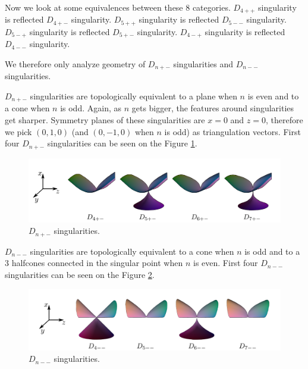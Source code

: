 Now we look at some equivalences between these 8 categories.
$D_{4++}$ singularity is reflected $D_{4+-}$ singularity.
$D_{5++}$ singularity is reflected $D_{5--}$ singularity.
$D_{5-+}$ singularity is reflected $D_{5+-}$ singularity.
$D_{4-+}$ singularity is reflected $D_{4--}$ singularity.

We therefore only analyze geometry of $D_{n+-}$ singularities and
$D_{n--}$ singularities.

$D_{n+-}$ singularities are topologically equivalent to a plane when $n$ is
even and to a cone when $n$ is odd. Again, as $n$ gets bigger, the features
around singularities get sharper. Symmetry planes of these singularities
are $x=0$ and $z=0$, therefore we pick $(0, 1, 0)$ (and $(0, -1, 0)$ when $n$ is odd)
as triangulation vectors. First four $D_{n+-}$ singularities can be seen on
the Figure \ref{img:7}.

\begin{figure}
    \centerline{\includegraphics[scale=0.5]{images/img7}}
    \caption[$D_{n+-}$ singularities TODO the coordinates are wrong!!]
    {$D_{n+-}$ singularities. \cite{morris2003client}}
    \label{img:7}
\end{figure}


$D_{n--}$ singularities are topologically equivalent to a cone when $n$ is
odd and to a 3 halfcones connected in the singular point when $n$ is even.
First four $D_{n--}$ singularities can be seen on the Figure \ref{img:8}.

\begin{figure}
    \centerline{\includegraphics[scale=0.5]{images/img8}}
    \caption[$D_{n--}$ singularities TODO the coordinates are wrong!!]
    {$D_{n--}$ singularities. \cite{morris2003client}}
    \label{img:8}
\end{figure}

